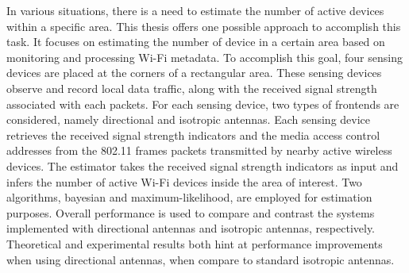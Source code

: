 \TAMUAbstractFormat

In various situations, there is a need to estimate the number of active devices within a specific area.
This thesis offers one possible approach to accomplish this task.
It focuses on estimating the number of device in a certain area based on monitoring and processing Wi-Fi metadata.
To accomplish this goal, four sensing devices are placed at the corners of a rectangular area.
These sensing devices observe and record local data traffic, along with the received signal strength associated with each packets.
For each sensing device, two types of frontends are considered, namely directional and isotropic antennas.
Each sensing device retrieves the received signal strength indicators and the media access control addresses from the 802.11 frames packets transmitted by nearby active wireless devices.
The estimator takes the received signal strength indicators as input and infers the number of active Wi-Fi devices inside the area of interest.
Two algorithms, bayesian and maximum-likelihood, are employed for estimation purposes.
Overall performance is used to compare and contrast the systems implemented with directional antennas and isotropic antennas, respectively.
Theoretical and experimental results both hint at performance improvements when using directional antennas, when compare to standard isotropic antennas.

